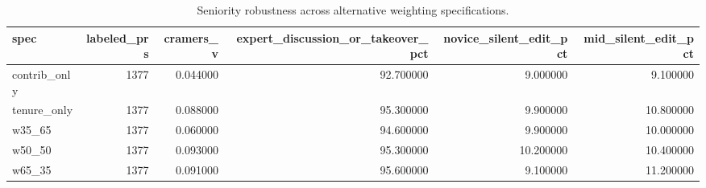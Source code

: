 \begin{table}[t]
\centering
\footnotesize
\caption{Seniority robustness across alternative weighting specifications.}
\label{tab:seniority-robustness}
\begin{tabular}{lrrrrr}
\toprule
spec & labeled\_prs & cramers\_v & expert\_discussion\_or\_takeover\_pct & novice\_silent\_edit\_pct & mid\_silent\_edit\_pct \\
\midrule
contrib\_only & 1377 & 0.044000 & 92.700000 & 9.000000 & 9.100000 \\
tenure\_only & 1377 & 0.088000 & 95.300000 & 9.900000 & 10.800000 \\
w35\_65 & 1377 & 0.060000 & 94.600000 & 9.900000 & 10.000000 \\
w50\_50 & 1377 & 0.093000 & 95.300000 & 10.200000 & 10.400000 \\
w65\_35 & 1377 & 0.091000 & 95.600000 & 9.100000 & 11.200000 \\
\bottomrule
\end{tabular}
\end{table}
